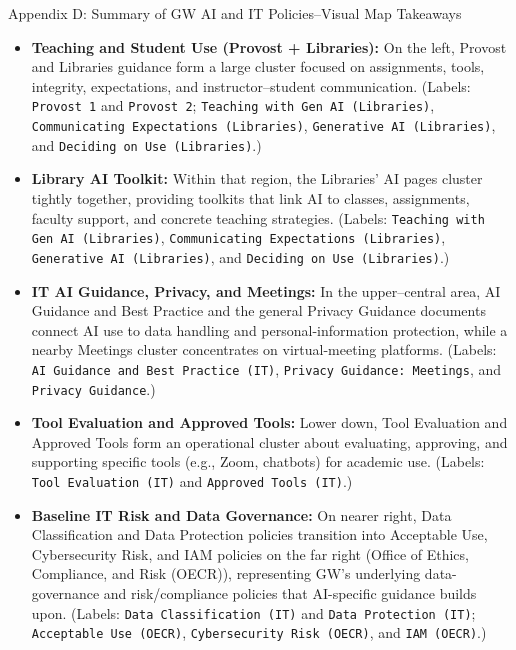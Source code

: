 \documentclass[aspectratio=169]{beamer}
\begin{document}
\begin{frame}{\small{Appendix D: Summary of GW AI and IT Policies--Visual Map Takeaways}}
\scriptsize
\vspace{5pt}
\begin{itemize}
  \item \textbf{Teaching and Student Use (Provost + Libraries):} On the left, Provost and Libraries guidance form a large cluster focused on assignments, tools, integrity, expectations, and instructor–student communication. (Labels: \texttt{Provost 1} and \texttt{Provost 2}; \texttt{Teaching with Gen AI (Libraries)}, \texttt{Communicating Expectations (Libraries)}, \texttt{Generative AI (Libraries)}, and \texttt{Deciding on Use (Libraries)}.)

  \item \textbf{Library AI Toolkit:} Within that region, the Libraries’ AI pages cluster tightly together, providing  toolkits that link AI to classes, assignments, faculty support, and concrete teaching strategies. (Labels: \texttt{Teaching with Gen AI (Libraries)}, \texttt{Communicating Expectations (Libraries)}, \texttt{Generative AI (Libraries)}, and \texttt{Deciding on Use (Libraries)}.)

  \item \textbf{IT AI Guidance, Privacy, and Meetings:} In the upper–central area, AI Guidance and Best Practice and the general Privacy Guidance documents connect AI use to data handling and personal-information protection, while a nearby Meetings cluster concentrates on virtual-meeting platforms. (Labels: \texttt{AI Guidance and Best Practice (IT)}, \texttt{Privacy Guidance: Meetings}, and \texttt{Privacy Guidance}.)

  \item \textbf{Tool Evaluation and Approved Tools:} Lower down, Tool Evaluation and Approved Tools form an operational cluster about evaluating, approving, and supporting specific tools (e.g., Zoom, chatbots) for academic use. (Labels: \texttt{Tool Evaluation (IT)} and \texttt{Approved Tools (IT)}.)

  \item \textbf{Baseline IT Risk and Data Governance:} On nearer right, Data Classification and Data Protection policies transition into Acceptable Use, Cybersecurity Risk, and IAM policies on the far right (Office of Ethics, Compliance, and Risk (OECR)), representing GW’s underlying data-governance and risk/compliance policies that AI-specific guidance builds upon. (Labels: \texttt{Data Classification (IT)} and \texttt{Data Protection (IT)}; \texttt{Acceptable Use (OECR)}, \texttt{Cybersecurity Risk (OECR)}, and \texttt{IAM (OECR)}.)
\end{itemize}

\end{frame}
\end{document}
